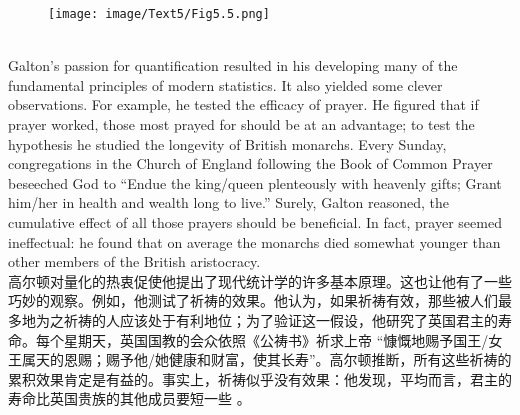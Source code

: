 \documentclass{article}
\begin{document}
\addtolength{\leftskip}{-1cm}

\begin{figure}
    \centering
    \texttt{[image: image/Text5/Fig5.5.png]}
\end{figure}

\\
Galton’s passion for quantification resulted in his developing many of the fundamental principles of modern statistics. It also yielded some clever observations. For example, he tested the efficacy of prayer. He figured that if prayer worked, those most prayed for should be at an advantage; to test the hypothesis he studied the longevity of British monarchs. Every Sunday, congregations in the Church of England following the Book of Common Prayer beseeched God to “Endue the king/queen plenteously with heavenly gifts; Grant him/her in health and wealth long to live.” Surely, Galton reasoned, the cumulative effect of all those prayers should be beneficial. In fact, prayer seemed ineffectual: he found that on average the monarchs died somewhat younger than other members of the British aristocracy.\\
高尔顿对量化的热衷促使他提出了现代统计学的许多基本原理。这也让他有了一些巧妙的观察。例如，他测试了祈祷的效果。他认为，如果祈祷有效，那些被人们最多地为之祈祷的人应该处于有利地位；为了验证这一假设，他研究了英国君主的寿命。每个星期天，英国国教的会众依照《公祷书》祈求上帝 “慷慨地赐予国王/女王属天的恩赐；赐予他/她健康和财富，使其长寿”。高尔顿推断，所有这些祈祷的累积效果肯定是有益的。事实上，祈祷似乎没有效果：他发现，平均而言，君主的寿命比英国贵族的其他成员要短一些 。\\
\end{document}
